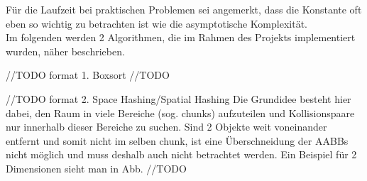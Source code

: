 Für die Laufzeit bei praktischen Problemen sei angemerkt, dass die Konstante oft eben so wichtig zu betrachten ist wie die asymptotische Komplexität. \\

Im folgenden werden 2 Algorithmen, die im Rahmen des Projekts implementiert wurden, näher beschrieben.

//TODO format
1. Boxsort
//TODO

//TODO format
2. Space Hashing/Spatial Hashing
Die Grundidee besteht hier dabei, den Raum in viele Bereiche (sog. chunks) aufzuteilen und Kollisionspaare nur innerhalb dieser Bereiche zu suchen. Sind 2 Objekte weit voneinander entfernt und somit nicht im selben chunk, ist eine Überschneidung der AABBs nicht möglich und muss deshalb auch nicht betrachtet werden. Ein Beispiel für 2 Dimensionen sieht man in Abb. //TODO \\



